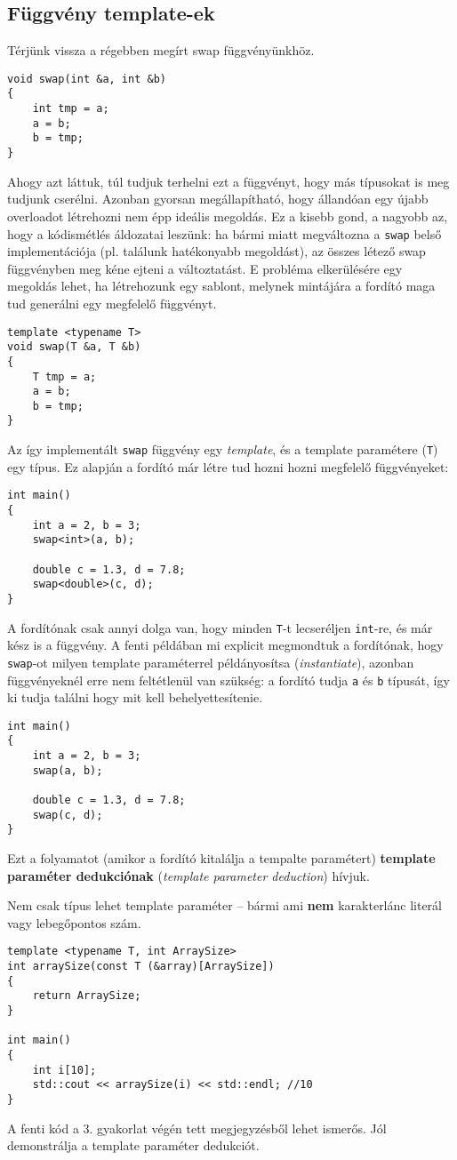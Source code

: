 \documentclass[a4paper,11.5pt,table]{article}
\begin{document}
	\subsection{Függvény template-ek}
	Térjünk vissza a régebben megírt swap függvényünkhöz.
	\begin{lstlisting}
void swap(int &a, int &b)
{
	int tmp = a;
	a = b;
	b = tmp;
}
	\end{lstlisting}
	Ahogy azt láttuk, túl tudjuk terhelni ezt a függvényt, hogy más típusokat is meg tudjunk cserélni.
	Azonban gyorsan megállapítható, hogy állandóan egy újabb overloadot létrehozni nem épp ideális megoldás. Ez a kisebb gond, a nagyobb az, hogy a kódismétlés áldozatai leszünk: ha bármi miatt megváltozna a \texttt{swap} belső implementációja (pl. találunk hatékonyabb megoldást), az összes létező swap függvényben meg kéne ejteni a változtatást. E probléma elkerülésére egy megoldás lehet, ha létrehozunk egy sablont, melynek mintájára a fordító maga tud generálni egy megfelelő függvényt.
	\begin{lstlisting}
template <typename T>
void swap(T &a, T &b)
{
	T tmp = a;
	a = b;
	b = tmp;
}
	\end{lstlisting}
	Az így implementált \texttt{swap} függvény egy \textit{template}, és a template paramétere (\texttt{T}) egy típus. Ez alapján a fordító már létre tud hozni hozni megfelelő függvényeket:
	\begin{lstlisting}
int main()
{
	int a = 2, b = 3;
	swap<int>(a, b);
	
	double c = 1.3, d = 7.8;
	swap<double>(c, d);
}
	\end{lstlisting}
	A fordítónak csak annyi dolga van, hogy minden \texttt{T}-t lecseréljen \texttt{int}-re, és már kész is a függvény. A fenti példában mi explicit megmondtuk a fordítónak, hogy \texttt{swap}-ot milyen template paraméterrel {példányosítsa} (\textit{instantiate}), azonban függvényeknél erre nem feltétlenül van szükség: a fordító tudja \texttt{a} és \texttt{b} típusát, így ki tudja találni hogy mit kell behelyettesítenie.
	\begin{lstlisting}
int main()
{
	int a = 2, b = 3;
	swap(a, b);
	
	double c = 1.3, d = 7.8;
	swap(c, d);
}
	\end{lstlisting}
	Ezt a folyamatot (amikor a fordító kitalálja a tempalte paramétert) \textbf{template paraméter dedukciónak} (\textit{template parameter deduction}) hívjuk.
	
	\medskip
	Nem csak típus lehet template paraméter -- bármi ami \textbf{nem} karakterlánc literál vagy lebegőpontos szám.
	\begin{lstlisting}
template <typename T, int ArraySize>
int arraySize(const T (&array)[ArraySize])
{
	return ArraySize;
}

int main()
{
	int i[10];
	std::cout << arraySize(i) << std::endl; //10
}
	\end{lstlisting}
	A fenti kód a 3. gyakorlat végén tett megjegyzésből lehet ismerős. Jól demonstrálja a template paraméter dedukciót.
\end{document}
